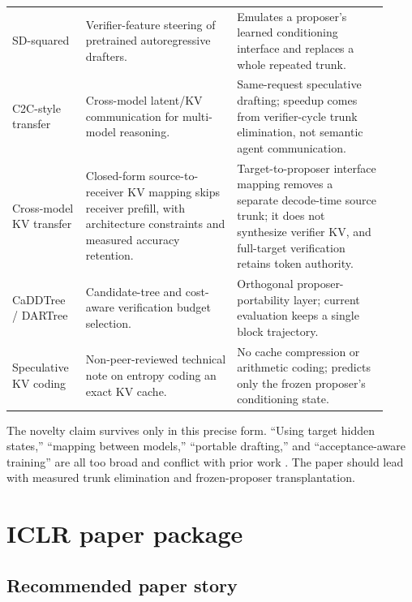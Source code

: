 \documentclass[10pt]{article}
\begin{document}
\begin{longtable}{@{}p{0.18\linewidth}p{0.37\linewidth}p{0.37\linewidth}@{}}
SD-squared \cite{berdoz2026sd2} & Verifier-feature steering of pretrained autoregressive drafters. & Emulates a proposer's learned conditioning interface and replaces a whole repeated trunk. \\
C2C-style transfer & Cross-model latent/KV communication for multi-model reasoning. & Same-request speculative drafting; speedup comes from verifier-cycle trunk elimination, not semantic agent communication. \\
Cross-model KV transfer \cite{heo2026crossmodelkv} & Closed-form source-to-receiver KV mapping skips receiver prefill, with architecture constraints and measured accuracy retention. & Target-to-proposer interface mapping removes a separate decode-time source trunk; it does not synthesize verifier KV, and full-target verification retains token authority. \\
CaDDTree / DARTree \cite{zhang2026caddtree,li2026dartree} & Candidate-tree and cost-aware verification budget selection. & Orthogonal proposer-portability layer; current evaluation keeps a single block trajectory. \\
Speculative KV coding \cite{finn2026speculativekvcoding} & Non-peer-reviewed technical note on entropy coding an exact KV cache. & No cache compression or arithmetic coding; predicts only the frozen proposer's conditioning state. \\
\bottomrule
\end{longtable}

The novelty claim survives only in this precise form. ``Using target hidden
states,'' ``mapping between models,'' ``portable drafting,'' and
``acceptance-aware training'' are all too broad and conflict with prior work
\cite{zou2026vsd,an2026pard2,lin2026eda}. The paper should lead with measured
trunk elimination and frozen-proposer transplantation.

\section{ICLR paper package}

\subsection{Recommended paper story}
\end{document}
